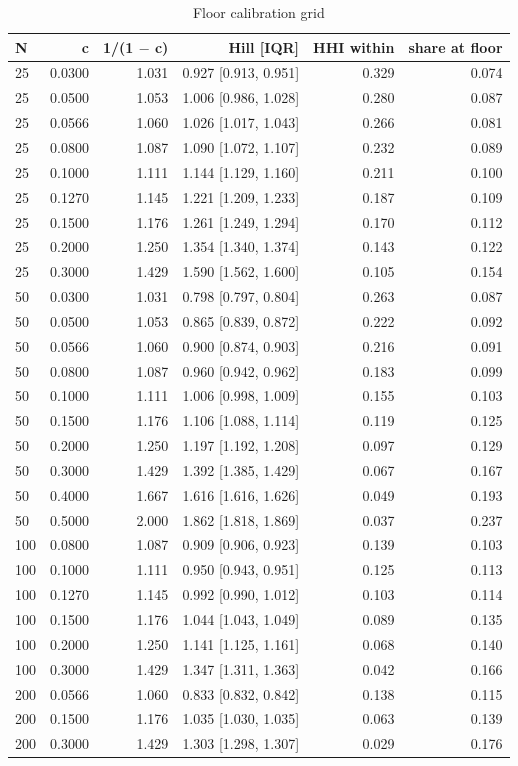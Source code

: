 \begin{table}[htbp]
\centering
\caption{Floor calibration grid}
\label{tab:a2_floor_calibration}
\small
\begin{tabular}{lrrrrr}
\toprule
N & c & 1/(1 $-$ c) & Hill [IQR] & HHI within & share at floor \\
\midrule
25 & 0.0300 & 1.031 & 0.927 [0.913, 0.951] & 0.329 & 0.074 \\
25 & 0.0500 & 1.053 & 1.006 [0.986, 1.028] & 0.280 & 0.087 \\
25 & 0.0566 & 1.060 & 1.026 [1.017, 1.043] & 0.266 & 0.081 \\
25 & 0.0800 & 1.087 & 1.090 [1.072, 1.107] & 0.232 & 0.089 \\
25 & 0.1000 & 1.111 & 1.144 [1.129, 1.160] & 0.211 & 0.100 \\
25 & 0.1270 & 1.145 & 1.221 [1.209, 1.233] & 0.187 & 0.109 \\
25 & 0.1500 & 1.176 & 1.261 [1.249, 1.294] & 0.170 & 0.112 \\
25 & 0.2000 & 1.250 & 1.354 [1.340, 1.374] & 0.143 & 0.122 \\
25 & 0.3000 & 1.429 & 1.590 [1.562, 1.600] & 0.105 & 0.154 \\
50 & 0.0300 & 1.031 & 0.798 [0.797, 0.804] & 0.263 & 0.087 \\
50 & 0.0500 & 1.053 & 0.865 [0.839, 0.872] & 0.222 & 0.092 \\
50 & 0.0566 & 1.060 & 0.900 [0.874, 0.903] & 0.216 & 0.091 \\
50 & 0.0800 & 1.087 & 0.960 [0.942, 0.962] & 0.183 & 0.099 \\
50 & 0.1000 & 1.111 & 1.006 [0.998, 1.009] & 0.155 & 0.103 \\
50 & 0.1500 & 1.176 & 1.106 [1.088, 1.114] & 0.119 & 0.125 \\
50 & 0.2000 & 1.250 & 1.197 [1.192, 1.208] & 0.097 & 0.129 \\
50 & 0.3000 & 1.429 & 1.392 [1.385, 1.429] & 0.067 & 0.167 \\
50 & 0.4000 & 1.667 & 1.616 [1.616, 1.626] & 0.049 & 0.193 \\
50 & 0.5000 & 2.000 & 1.862 [1.818, 1.869] & 0.037 & 0.237 \\
100 & 0.0800 & 1.087 & 0.909 [0.906, 0.923] & 0.139 & 0.103 \\
100 & 0.1000 & 1.111 & 0.950 [0.943, 0.951] & 0.125 & 0.113 \\
100 & 0.1270 & 1.145 & 0.992 [0.990, 1.012] & 0.103 & 0.114 \\
100 & 0.1500 & 1.176 & 1.044 [1.043, 1.049] & 0.089 & 0.135 \\
100 & 0.2000 & 1.250 & 1.141 [1.125, 1.161] & 0.068 & 0.140 \\
100 & 0.3000 & 1.429 & 1.347 [1.311, 1.363] & 0.042 & 0.166 \\
200 & 0.0566 & 1.060 & 0.833 [0.832, 0.842] & 0.138 & 0.115 \\
200 & 0.1500 & 1.176 & 1.035 [1.030, 1.035] & 0.063 & 0.139 \\
200 & 0.3000 & 1.429 & 1.303 [1.298, 1.307] & 0.029 & 0.176 \\
\bottomrule
\end{tabular}
\end{table}
